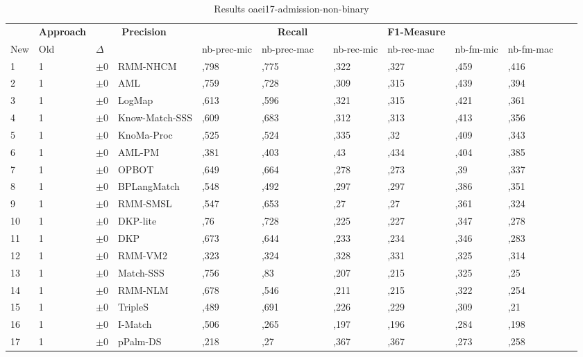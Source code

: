 \begin{table}[htb]
\setlength{\tabcolsep}{0.5em}
\centering
\scriptsize
\begin{tabular}[tb]{lllp{2.3cm}llllllllll}
\noalign{\smallskip}\hline\noalign{\smallskip}
\multicolumn{3}{c}{\textbf{Rank}}& \textbf{Approach}  & \multicolumn{2}{c}{\textbf{Precision}}  & \hspace*{1mm}  & \multicolumn{2}{c}{\textbf{Recall}}  & \hspace*{1mm}  & \multicolumn{2}{c}{\textbf{F1-Measure}}  & \hspace*{1mm} \\
New & Old & $\Delta$ & &nb-prec-mic & nb-prec-mac && nb-rec-mic & nb-rec-mac && nb-fm-mic & nb-fm-mac\\
\noalign{\smallskip}\hline\noalign{\smallskip}
1 & 1 		& $\pm$0 &RMM-NHCM    	&	,798 & ,775 & & ,322 & ,327 & & ,459 & ,416\\
2 & 1 		& $\pm$0 &AML    	&	,759 & ,728 & & ,309 & ,315 & & ,439 & ,394\\
3 & 1 		& $\pm$0 &LogMap    	&	,613 & ,596 & & ,321 & ,315 & & ,421 & ,361\\
4 & 1 		& $\pm$0 &Know-Match-SSS    	&	,609 & ,683 & & ,312 & ,313 & & ,413 & ,356\\
5 & 1 		& $\pm$0 &KnoMa-Proc    	&	,525 & ,524 & & ,335 & ,32 & & ,409 & ,343\\
6 & 1 		& $\pm$0 &AML-PM    	&	,381 & ,403 & & ,43 & ,434 & & ,404 & ,385\\
7 & 1 		& $\pm$0 &OPBOT    	&	,649 & ,664 & & ,278 & ,273 & & ,39 & ,337\\
8 & 1 		& $\pm$0 &BPLangMatch    	&	,548 & ,492 & & ,297 & ,297 & & ,386 & ,351\\
9 & 1 		& $\pm$0 &RMM-SMSL    	&	,547 & ,653 & & ,27 & ,27 & & ,361 & ,324\\
10 & 1 		& $\pm$0 &DKP-lite    	&	,76 & ,728 & & ,225 & ,227 & & ,347 & ,278\\
11 & 1 		& $\pm$0 &DKP    	&	,673 & ,644 & & ,233 & ,234 & & ,346 & ,283\\
12 & 1 		& $\pm$0 &RMM-VM2    	&	,323 & ,324 & & ,328 & ,331 & & ,325 & ,314\\
13 & 1 		& $\pm$0 &Match-SSS    	&	,756 & ,83 & & ,207 & ,215 & & ,325 & ,25\\
14 & 1 		& $\pm$0 &RMM-NLM    	&	,678 & ,546 & & ,211 & ,215 & & ,322 & ,254\\
15 & 1 		& $\pm$0 &TripleS    	&	,489 & ,691 & & ,226 & ,229 & & ,309 & ,21\\
16 & 1 		& $\pm$0 &I-Match    	&	,506 & ,265 & & ,197 & ,196 & & ,284 & ,198\\
17 & 1 		& $\pm$0 &pPalm-DS    	&	,218 & ,27 & & ,367 & ,367 & & ,273 & ,258\\
\end{tabular}
\caption{Results oaei17-admission-non-binary}
\label{tbl:results}
\end{table}